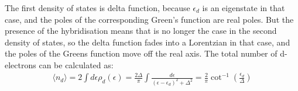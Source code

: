 The first density of states is delta function, because \(\epsilon_d\) is an eigenstate in that case, and the poles of the corresponding Green's function are real poles.
But the presence of the hybridisation means that is no longer the case in the second density of states, so the delta function fades into a Lorentzian in that case, and the poles of the Greens function move off the real axis.
The total number of d-electrons can be calculated as:
\begin{equation}\begin{aligned}
	\label{total}
	\langle  n_d\rangle = 2\int d\epsilon \rho_d(\epsilon) = \frac{2\Delta}{\pi} \int \frac{d\epsilon}{(\epsilon-\epsilon_d)^2 + \Delta^2} = \frac{2}{\pi}\cot^{-1}\left(\frac{\epsilon_d}{\Delta}\right)
\end{aligned}\end{equation}
